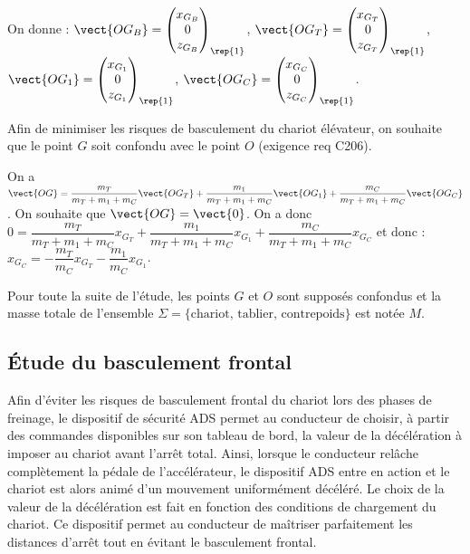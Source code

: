 \begin{multicols}{2}
On donne : 
$\vect{OG_B}=\begin{pmatrix}x_{G_B} \\ 0 \\ z_{G_B}\end{pmatrix}_{\rep{1}}$,
$\vect{OG_T}=\begin{pmatrix}x_{G_T} \\ 0 \\ z_{G_T}\end{pmatrix}_{\rep{1}}$,
$\vect{OG_1}=\begin{pmatrix}x_{G_1} \\ 0 \\ z_{G_1}\end{pmatrix}_{\rep{1}}$,
$\vect{OG_C}=\begin{pmatrix}x_{G_C} \\ 0 \\ z_{G_C}\end{pmatrix}_{\rep{1}}$.

Afin de minimiser les risques de basculement du chariot élévateur, on souhaite que le point $G$ soit
confondu avec le point $O$ (exigence req C206).
\fi


\ifprof
\begin{corrige}
On a $\vect{OG}=\dfrac{m_T}{m_T+m_1+m_C}\vect{OG_T}+\dfrac{m_1}{m_T+m_1+m_C}\vect{OG_1}+\dfrac{m_C}{m_T+m_1+m_C}\vect{OG_C}$. On souhaite que $\vect{OG}=\vect{0}$. 
On a donc $0=\dfrac{m_T}{m_T+m_1+m_C}x_{G_T}+\dfrac{m_1}{m_T+m_1+m_C}x_{G_1}+\dfrac{m_C}{m_T+m_1+m_C}x_{G_C}$ et donc : $x_{G_C}=-\dfrac{m_T}{m_C}x_{G_T}-\dfrac{m_1}{m_C}x_{G_1}$.
\end{corrige}
\else
\fi


Pour toute la suite de l’étude, les points $G$ et $O$ sont supposés confondus et la masse totale de
l’ensemble $\Sigma =  \{\text{chariot, tablier, contrepoids}\}$ est notée $M$.

\subsection*{Étude du basculement frontal}
\ifprof
\else
Afin d’éviter les risques de basculement frontal du chariot lors des phases de freinage, le dispositif de
sécurité ADS permet au conducteur de choisir, à partir des commandes disponibles sur son tableau de
bord, la valeur de la décélération à imposer au chariot avant l’arrêt total. Ainsi, lorsque le conducteur
relâche complètement la pédale de l’accélérateur, le dispositif ADS entre en action et le chariot est
alors animé d’un mouvement uniformément décéléré. Le choix de la valeur de la décélération est fait
en fonction des conditions de chargement du chariot. Ce dispositif permet au conducteur de maîtriser
parfaitement les distances d’arrêt tout en évitant le basculement frontal.


\end{multicols}
